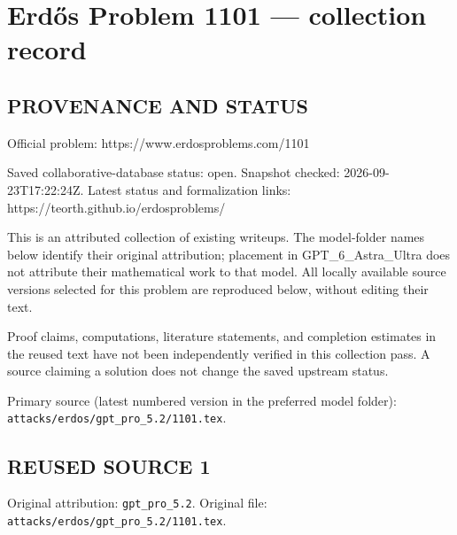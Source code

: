 \section*{Erd\H{o}s Problem 1101 --- collection record}

\subsection*{PROVENANCE AND STATUS}
Official problem: https://www.erdosproblems.com/1101

Saved collaborative-database status: open.
Snapshot checked: 2026-09-23T17:22:24Z.
Latest status and formalization links: https://teorth.github.io/erdosproblems/

This is an attributed collection of existing writeups. The model-folder names below identify their original attribution; placement in GPT\_6\_Astra\_Ultra does not attribute their mathematical work to that model. All locally available source versions selected for this problem are reproduced below, without editing their text.

Proof claims, computations, literature statements, and completion estimates in the reused text have not been independently verified in this collection pass. A source claiming a solution does not change the saved upstream status.

Primary source (latest numbered version in the preferred model folder): \texttt{attacks/erdos/gpt\_pro\_5.2/1101.tex}.

\subsection*{REUSED SOURCE 1}
Original attribution: \texttt{gpt\_pro\_5.2}.
Original file: \texttt{attacks/erdos/gpt\_pro\_5.2/1101.tex}.


